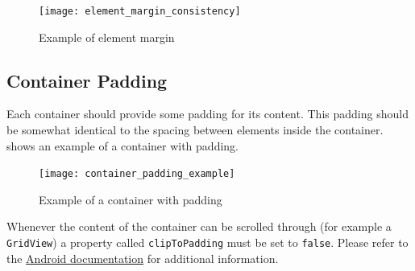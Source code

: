 \begin{figure}[h]
        \centering
        \texttt{[image: element\_margin\_consistency]}
        \caption{Example of element margin}
        \label{fig:element_margin_consistency}
\end{figure}


\subsection{Container Padding}
Each container should provide some padding for its content. This padding should be somewhat identical to the spacing between elements inside the container.  shows an example of a container with padding. 

\begin{figure}[h]
        \centering
        \texttt{[image: container\_padding\_example]}
        \caption{Example of a container with padding}
        \label{fig:container_padding_example}
\end{figure}

\begin{note}
        Whenever the content of the container can be scrolled through (for example a \texttt{GridView}) a property called \texttt{clipToPadding} must be set to \texttt{false}. Please refer to the \href{http://developer.android.com/reference/android/view/ViewGroup.html#attr_android:clipToPadding}{Android documentation} for additional information.
\end{note}
